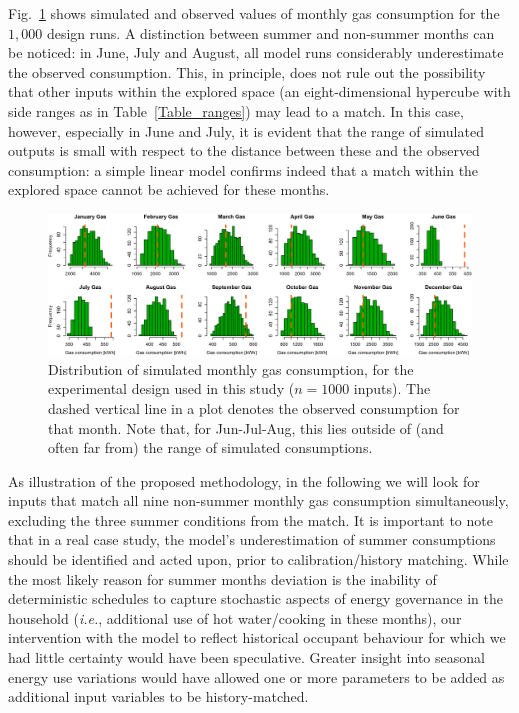 \documentclass[preprint,12pt, sort&compress]{elsarticle}
\begin{document}
Fig.~\ref{Fig_gas_histograms} shows simulated and observed values of monthly gas consumption for the $1,000$ design runs. A distinction between summer and non-summer months can be noticed: in June, July and August, all model runs considerably underestimate the observed consumption. This, in principle, does not rule out the possibility that other inputs within the explored space (an eight-dimensional hypercube with side ranges as in Table~\ref{Table_ranges}) may lead to a match. In this case, however, especially in June and July, it is evident that the range of simulated outputs is small with respect to the distance between these and the observed consumption: a simple linear model confirms indeed that a match within the explored space cannot be achieved for these months.

\begin{figure}
\includegraphics[width=\textwidth]{Simulation_histograms/Batch_2_only/Gas_Runs/All_months_gas_2x6}
\caption{Distribution of simulated monthly gas consumption, for the experimental design used in this study ($n=1000$ inputs). The dashed vertical line in a plot denotes the observed consumption for that month. Note that, for Jun-Jul-Aug, this lies outside of (and often far from) the range of simulated consumptions.}
\label{Fig_gas_histograms}
\end{figure}

As illustration of the proposed methodology, in the following we will look for inputs that match all nine non-summer monthly gas consumption simultaneously, excluding the three summer conditions from the match. It is important to note that in a real case study, the model’s underestimation of summer consumptions should be identified and acted upon, prior to calibration/history matching. While the most likely reason for summer months deviation is the inability of deterministic schedules to capture stochastic aspects of energy governance in the household (\textit{i.e.}, additional use of hot water/cooking in these months), our intervention with the model to reflect historical occupant behaviour for which we had little certainty would have been speculative. Greater insight into seasonal energy use variations would have allowed one or more parameters to be added as additional input variables to be history-matched. 
\end{document}
